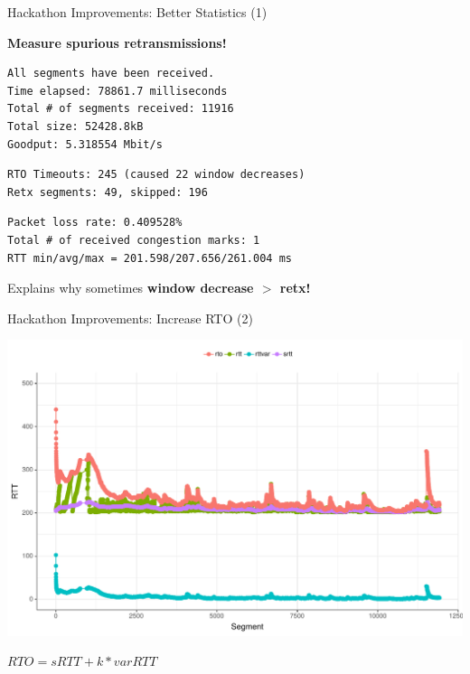 \begin{frame}[fragile]{Hackathon Improvements: Better Statistics (1)}

\textbf{Measure spurious retransmissions!}

\footnotesize
\begin{verbatim}
All segments have been received.
Time elapsed: 78861.7 milliseconds
Total # of segments received: 11916
Total size: 52428.8kB
Goodput: 5.318554 Mbit/s
\end{verbatim}
\begin{verbatim}
RTO Timeouts: 245 (caused 22 window decreases)
Retx segments: 49, skipped: 196
\end{verbatim}
\begin{verbatim}
Packet loss rate: 0.409528%
Total # of received congestion marks: 1
RTT min/avg/max = 201.598/207.656/261.004 ms
\end{verbatim}

\normalsize

\pause
Explains why sometimes \textbf{window decrease $>$ retx!}



\end{frame}


\begin{frame}[fragile]{Hackathon Improvements: Increase RTO (2)}

\includegraphics[width=\linewidth]{images/rtt_rto200ms.pdf}

$RTO = sRTT + k * varRTT$

\end{frame}


